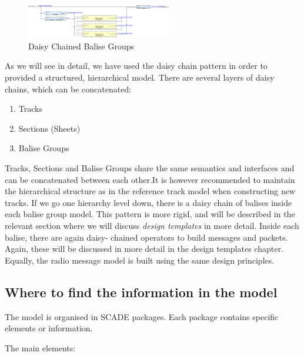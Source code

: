 \documentclass{template/openetcs_article}
\begin{document}
\begin{figure}
  \centering
  \includegraphics[angle=90, origin=c,width=2.5in]{images/DaisyChain.eps}
  \caption{Daisy Chained Balise Groups}
  \label{fig:daisy}
\end{figure}

As we will see in detail, we have used the daisy chain pattern in order to provided a structured, hierarchical model. There are several layers of daisy chains, which can be concatenated:
\begin{enumerate}
 \item Tracks 
 \item Sections (Sheets)
 \item Balise Groups
\end{enumerate}
Tracks, Sections and Balise Groups share the same semantics and interfaces and can be concatenated between each other.\newline It is however recommended to maintain the hierarchical structure as in the reference track model when constructing new tracks.
If we go one hierarchy level down, there is a daisy chain of balises inside each balise group model.
This pattern is more rigid, and will be described in the relevant section where we will discuss \emph{design templates} in more detail.\newline
Inside each balise, there are again daisy- chained operators to build messages and packets. Again, these will be discussed in more detail in the design templates chapter.\newline\newline
Equally, the radio message model is built using the same design principles.


\subsection{Where to find the information in the model}

The model is organised in SCADE packages. Each package contains specific elements or information.\newline

The main elements:
\end{document}
